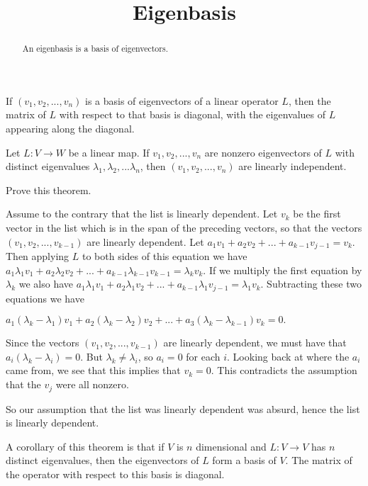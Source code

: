 \documentclass{ximera}
\title{Eigenbasis}
\begin{document}
\begin{abstract}
  An eigenbasis is a basis of eigenvectors.
\end{abstract}

\begin{observation}
  If $(v_1,v_2,...,v_n)$ is a basis of eigenvectors of a linear
  operator $L$, then the matrix of $L$ with respect to that basis is
  diagonal, with the eigenvalues of $L$ appearing along the diagonal.
\end{observation}

\begin{theorem}
  Let $L:V \to W$ be a linear map. If $v_1,v_2,...,v_n$ are nonzero eigenvectors of $L$ with distinct eigenvalues $\lambda_1,\lambda_2,...\lambda_n$, then $(v_1,v_2,...,v_n)$
  are linearly independent.
\end{theorem}

Prove this theorem.

\begin{free-response}
  Assume to the contrary that the list is linearly dependent.  Let $v_k$ be the first vector in the list which is in the span of the preceding vectors, 
  so that the vectors $(v_1,v_2,...,v_{k-1})$  are linearly dependent.  
  Let $a_1v_1+a_2v_2+...+a_{k-1}v_{j-1} = v_k$.  Then applying $L$ to both sides of this equation we have
  $a_1\lambda_1 v_1+a_2\lambda_2 v_2+ ...+a_{k-1}\lambda_{k-1} v_{k-1} = \lambda_k v_k$.  If we multiply the first equation by $\lambda_k$ we also have
  $a_1\lambda_1v_1+a_2\lambda_1v_2+...+a_{k-1}\lambda_1v_{j-1} = \lambda_1v_k$.  Subtracting these two equations we have
  
  \(
  a_1(\lambda_k-\lambda_1)v_1+a_2(\lambda_k-\lambda_2)v_2+...+a_3(\lambda_k-\lambda_{k-1})v_k=0.
  \)
  
  Since the vectors   $(v_1,v_2,...,v_{k-1})$  are linearly dependent, we must have that $a_i(\lambda_k - \lambda_i) = 0$.  But $\lambda_k \neq \lambda_i$, so 
  $a_i=0$ for each $i$.  Looking back at where the $a_i$ came from, we see that this implies that $v_k=0$.  This contradicts the assumption that the $v_j$ were all nonzero.
  
  So our assumption that the list was linearly dependent was absurd, hence the list is linearly dependent.
\end{free-response}

A corollary of this theorem is that if $V$ is $n$ dimensional and $L: V \to V$ has $n$ distinct eigenvalues, then the eigenvectors of $L$ form a basis of $V$.
The matrix of the operator with respect to this basis is diagonal.
	
\end{document}
